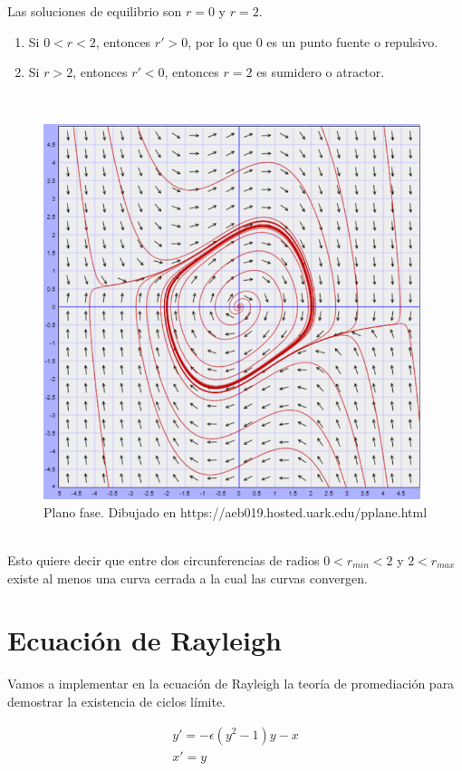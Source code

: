 \documentclass[12pt, a4paper]{report}
\begin{document}
Las soluciones de equilibrio son $r=0$ y $r=2$.
\begin{enumerate}
	\item Si $0<r<2$, entonces $r'>0$, por lo que $0$ es un punto fuente o repulsivo.
	\item Si $r>2$, entonces $r'<0$, entonces $r=2$ es sumidero o atractor.
\end{enumerate}\\

\begin{figure}[h]
	\centering
	\includegraphics[width=11cm]{vanderpol.png}
	\caption{Plano fase. Dibujado en https://aeb019.hosted.uark.edu/pplane.html}
\end{figure}
\\Esto quiere decir que entre dos circunferencias de radios $0<r_{min}<2$ y $2<r_{max}$
existe al menos una curva cerrada a la cual las curvas convergen.

\newpage

\section{Ecuación de Rayleigh}

Vamos a implementar en la ecuación de Rayleigh la teoría de promediación para demostrar la existencia de ciclos límite.

\begin{equation}\label{eq: Rayleigh}
	\begin{matrix}
		y'=-\epsilon(y^2-1)y-x \\
		x'=y
	\end{matrix}
\end{equation}
\end{document}
